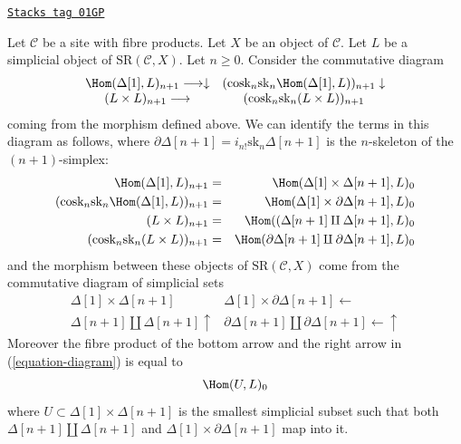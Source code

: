 \begin{lemma}
\label{hypercovering-lemma-hom-hypercovering}
\href{https://stacks.math.columbia.edu/tag/01GP}{\texttt{Stacks tag 01GP}}

Let $\mathcal{C}$ be a site with fibre products.
Let $X$ be an object of $\mathcal{C}$.
Let $L$ be a simplicial object of $\text{SR}(\mathcal{C}, X)$.
Let $n \geq 0$. Consider the commutative diagram
\begin{equation}
\label{equation-diagram}
\begin{array}{cc}\Hom(\Delta[1], L)_{n + 1} \longrightarrow\downarrow & (\text{cosk}_n \text{sk}_n \Hom(\Delta[1], L))_{n + 1} \downarrow \\ (L \times L)_{n + 1} \longrightarrow & (\text{cosk}_n \text{sk}_n (L \times L))_{n + 1}\end{array}
\end{equation}
coming from the morphism defined above.
We can identify the terms in this diagram as follows,
where
$\partial \Delta[n + 1] = i_{n!}\text{sk}_n \Delta[n + 1]$
is the $n$-skeleton of the $(n + 1)$-simplex:
\begin{eqnarray*}
\Hom(\Delta[1], L)_{n + 1}
& = &
\Hom(\Delta[1] \times \Delta[n + 1], L)_0 \\
(\text{cosk}_n \text{sk}_n \Hom(\Delta[1], L))_{n + 1}
& = &
\Hom(\Delta[1] \times \partial \Delta[n + 1], L)_0 \\
(L \times L)_{n + 1}
& = &
\Hom(
(\Delta[n + 1] \amalg \Delta[n + 1], L)_0 \\
(\text{cosk}_n \text{sk}_n (L \times L))_{n + 1}
& = &
\Hom(
\partial \Delta[n + 1]
\amalg
\partial \Delta[n + 1], L)_0
\end{eqnarray*}
and the morphism between these objects of $\text{SR}(\mathcal{C}, X)$
come from the commutative diagram of simplicial sets
\begin{equation}
\label{equation-dual-diagram}
\begin{array}{cc}\Delta[1] \times \Delta[n + 1] & \Delta[1] \times \partial\Delta[n + 1] \longleftarrow \\ \Delta[n + 1] \amalg \Delta[n + 1] \uparrow & \partial\Delta[n + 1] \amalg \partial\Delta[n + 1]
\longleftarrow\uparrow\end{array}
\end{equation}
Moreover the fibre product of the bottom arrow and the
right arrow in (\ref{equation-diagram}) is equal to
$$
\Hom(U, L)_0
$$
where $U \subset \Delta[1] \times \Delta[n + 1]$
is the smallest simplicial subset such that both
$\Delta[n + 1] \amalg \Delta[n + 1]$ and
$\Delta[1] \times \partial\Delta[n + 1]$ map into it.
\end{lemma}

